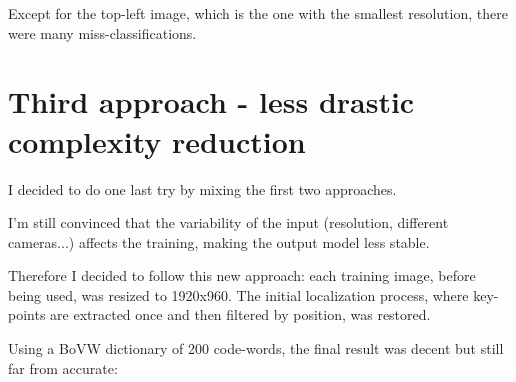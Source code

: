\documentclass[]{report}
\begin{document}
\vspace{0.5cm}

Except for the top-left image, which is the one with the smallest resolution, there were many miss-classifications.

\section{Third approach - less drastic complexity reduction}
I decided to do one last try by mixing the first two approaches.

I'm still convinced that the variability of the input (resolution, different cameras...) affects the training, making the output model less stable.

Therefore I decided to follow this new approach: each training image, before being used, was resized to 1920x960. The initial localization process, where key-points are extracted once and then filtered by position, was restored.

Using a BoVW dictionary of 200 code-words, the final result was decent but still far from accurate:

\vspace{0.5cm}
\end{document}
